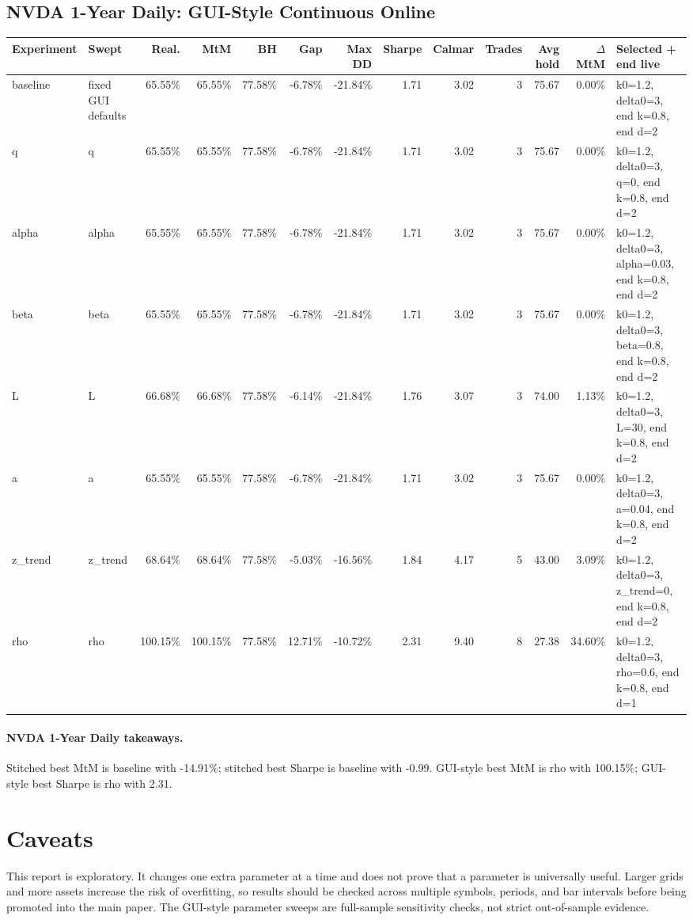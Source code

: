 \documentclass[10pt]{article}
\begin{document}
\subsection*{NVDA 1-Year Daily: GUI-Style Continuous Online}
\scriptsize
\setlength{\tabcolsep}{3pt}
\begin{tabular}{p{0.85in}p{0.95in}rrrrrrrrrrp{1.15in}}
\toprule
Experiment & Swept & Real. & MtM & BH & Gap & Max DD & Sharpe & Calmar & Trades & Avg hold & $\Delta$ MtM & Selected + end live \\
\midrule
baseline & fixed GUI defaults & 65.55\% & 65.55\% & 77.58\% & -6.78\% & -21.84\% & 1.71 & 3.02 & 3 & 75.67 & 0.00\% & k0=1.2, delta0=3, end k=0.8, end d=2 \\
q & q & 65.55\% & 65.55\% & 77.58\% & -6.78\% & -21.84\% & 1.71 & 3.02 & 3 & 75.67 & 0.00\% & k0=1.2, delta0=3, q=0, end k=0.8, end d=2 \\
alpha & alpha & 65.55\% & 65.55\% & 77.58\% & -6.78\% & -21.84\% & 1.71 & 3.02 & 3 & 75.67 & 0.00\% & k0=1.2, delta0=3, alpha=0.03, end k=0.8, end d=2 \\
beta & beta & 65.55\% & 65.55\% & 77.58\% & -6.78\% & -21.84\% & 1.71 & 3.02 & 3 & 75.67 & 0.00\% & k0=1.2, delta0=3, beta=0.8, end k=0.8, end d=2 \\
L & L & 66.68\% & 66.68\% & 77.58\% & -6.14\% & -21.84\% & 1.76 & 3.07 & 3 & 74.00 & 1.13\% & k0=1.2, delta0=3, L=30, end k=0.8, end d=2 \\
a & a & 65.55\% & 65.55\% & 77.58\% & -6.78\% & -21.84\% & 1.71 & 3.02 & 3 & 75.67 & 0.00\% & k0=1.2, delta0=3, a=0.04, end k=0.8, end d=2 \\
z\_trend & z\_trend & 68.64\% & 68.64\% & 77.58\% & -5.03\% & -16.56\% & 1.84 & 4.17 & 5 & 43.00 & 3.09\% & k0=1.2, delta0=3, z\_trend=0, end k=0.8, end d=2 \\
rho & rho & 100.15\% & 100.15\% & 77.58\% & 12.71\% & -10.72\% & 2.31 & 9.40 & 8 & 27.38 & 34.60\% & k0=1.2, delta0=3, rho=0.6, end k=0.8, end d=1 \\
\bottomrule
\end{tabular}
\normalsize

\paragraph{NVDA 1-Year Daily takeaways.}
Stitched best MtM is baseline with
-14.91\%; stitched best Sharpe is
baseline with -0.99.
GUI-style best MtM is rho with
100.15\%; GUI-style best Sharpe is
rho with 2.31.


\section*{Caveats}
This report is exploratory. It changes one extra parameter at a time and does
not prove that a parameter is universally useful. Larger grids and more assets
increase the risk of overfitting, so results should be checked across multiple
symbols, periods, and bar intervals before being promoted into the main paper.
The GUI-style parameter sweeps are full-sample sensitivity checks, not strict
out-of-sample evidence.
\end{document}

